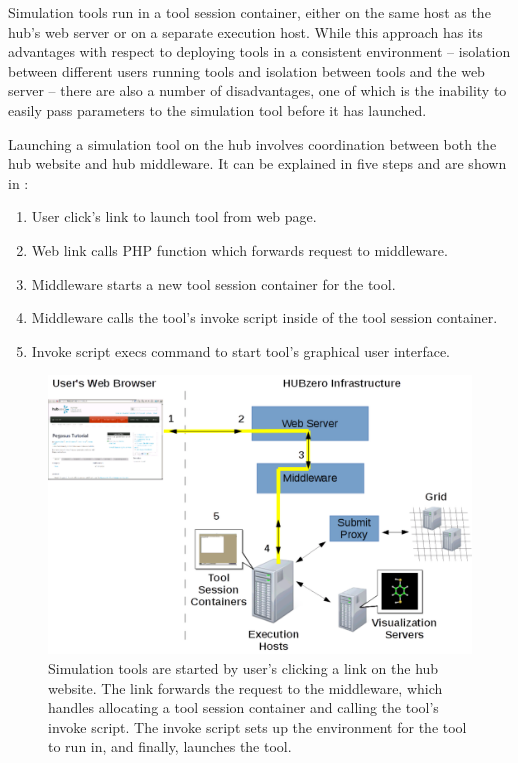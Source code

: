 Simulation tools run in a tool session container, either on the same host as
the hub's web server or on a separate execution host. While this approach has
its advantages with respect to deploying tools in a consistent environment --
isolation between different users running tools and isolation between tools and
the web server -- there are also a number of disadvantages, one of which is the
inability to easily pass parameters to the simulation tool before it has
launched.

Launching a simulation tool on the hub involves coordination between both the
hub website and hub middleware. It can be explained in five steps and are shown
in :

\begin{enumerate}
\item User click's link to launch tool from web page.
\item Web link calls PHP function which forwards request to middleware.
\item Middleware starts a new tool session container for the tool.
\item Middleware calls the tool's invoke script inside of the tool session container.
\item Invoke script execs command to start tool's graphical user interface.
\end{enumerate}

\begin{figure}[ht]
  \centering
  \includegraphics[width=\textwidth]
    {../../images/eps/start+tool+session+container+diagram2.pdf}
  \caption{ Simulation tools are started by user's clicking a link on the hub
            website. The link forwards the request to the middleware, which
            handles allocating a tool session container and calling the tool's
            invoke script. The invoke script sets up the environment for the
            tool to run in, and finally, launches the tool.}
  \label{fig:start_tool_session_container_diagram}
\end{figure}

